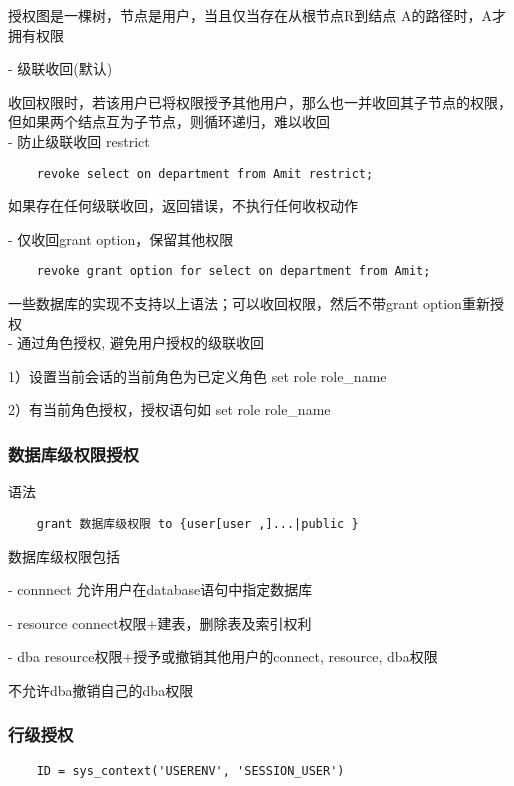 \documentclass{article}        %
\begin{document}
授权图是一棵树，节点是用户，当且仅当存在从根节点R到结点
A的路径时，A才拥有权限 

- 级联收回(默认) 

收回权限时，若该用户已将权限授予其他用户，那么也一并收回其子节点的权限，
但如果两个结点互为子节点，则循环递归，难以收回\\ 

- 防止级联收回 restrict 

\begin{verbatim}
    revoke select on department from Amit restrict; 
\end{verbatim}
如果存在任何级联收回，返回错误，不执行任何收权动作 

- 仅收回grant option，保留其他权限 

\begin{verbatim}
    revoke grant option for select on department from Amit; 
\end{verbatim}

一些数据库的实现不支持以上语法；可以收回权限，然后不带grant option重新授权 \\

- 通过角色授权, 避免用户授权的级联收回 

1）设置当前会话的当前角色为已定义角色 
set role role\_name 

2）有当前角色授权，授权语句如 
set role role\_name 

\subsubsection{数据库级权限授权}

语法 

\begin{verbatim}
    grant 数据库级权限 to {user[user ,]...|public }
\end{verbatim}

数据库级权限包括 

- connnect 允许用户在database语句中指定数据库 

- resource connect权限+建表，删除表及索引权利 

- dba resource权限+授予或撤销其他用户的connect, resource, dba权限 

不允许dba撤销自己的dba权限 

\subsubsection{行级授权}

\begin{verbatim}
    ID = sys_context('USERENV', 'SESSION_USER')
\end{verbatim}
\end{document}
